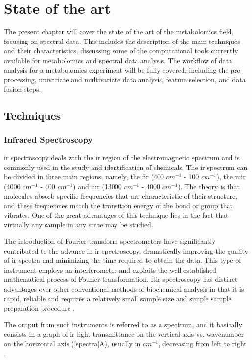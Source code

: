 
\chapter{State of the art}

The present chapter will cover the state of the art of the metabolomics field, focusing on spectral data. This includes the description of the main techniques and their characteristics, discussing some of the computational tools currently available for metabolomics and spectral data analysis. The workflow of data analysis for a metabolomics experiment will be fully covered, including the pre-processing, univariate and multivariate data analysis, feature selection, and data fusion steps.


\section{Techniques}

\subsection{Infrared Spectroscopy}

\acrfull{ir} spectroscopy deals with the \gls{ir} region of the electromagnetic spectrum and is commonly used in the study and identification of chemicals. The \gls{ir} spectrum can be divided in three main regions, namely, the \gls{fir} (400 $ cm^{-1} $ - 100 $ cm^{-1} $), the \gls{mir} (4000 $ cm^{-1} $ - 400 $ cm^{-1} $) and \gls{nir} (13000 $ cm^{-1} $ - 4000 $ cm^{-1} $). The theory is that molecules absorb specific frequencies that are characteristic of their structure, and these frequencies match the transition energy of the bond or group that vibrates. One of the great advantages of this technique lies in the fact that virtually any sample in any state may be studied.

The introduction of Fourier-transform spectrometers have significantly contributed to the advance in \gls{ir} spectroscopy, dramatically improving the quality of \gls{ir} spectra and minimizing the time required to obtain the data. This type of instrument employs an interferometer and exploits the well established mathematical process of Fourier-transformation. \gls{ftir} spectroscopy has distinct advantages over other conventional methods of biochemical analysis in that it is rapid, reliable and requires a relatively small sample size and simple sample preparation procedure \citep{kansiz1999fourier}. 

The output from such instruments is referred to as a spectrum, and it basically consists in a graph of \gls{ir} light transmittance on the vertical axis vs. wavenumber on the horizontal axis (\autoref{spectra}A), usually in $ cm^{-1} $, decreasing from left to right \citep{Stuart2004}.

